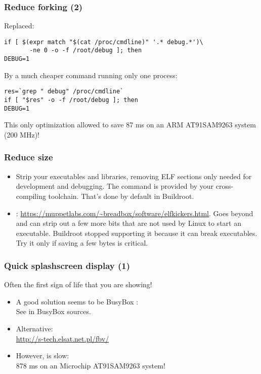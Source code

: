 \begin{frame}[fragile]
\frametitle{Reduce forking (2)}
Replaced:
\begin{block}{}
\begin{verbatim}
if [ $(expr match "$(cat /proc/cmdline)" '.* debug.*')\
       -ne 0 -o -f /root/debug ]; then
DEBUG=1
\end{verbatim}
\end{block}
By a much cheaper command running only one process:
\begin{block}{}
\begin{verbatim}
res=`grep " debug" /proc/cmdline`
if [ "$res" -o -f /root/debug ]; then
DEBUG=1
\end{verbatim}
\end{block}
This only optimization allowed to save 87 ms on an ARM AT91SAM9263
system (200 MHz)!
\end{frame}


\begin{frame}
\frametitle{Reduce size}
\begin{itemize}
	\item Strip your executables and libraries, removing ELF sections
		only needed for development and debugging. The 
		command is provided by your cross-compiling toolchain.
		That's done by default in Buildroot.
	\item {}:
		\url{https://muppetlabs.com/~breadbox/software/elfkickers.html}.
		Goes beyond  and can strip out a few more bits
		that are not used by Linux to start an executable.
		Buildroot stopped supporting it because it can break
	        executables. Try it only if saving a few bytes is
		critical.
\end{itemize}
\end{frame}

\begin{frame}
\frametitle{Quick splashscreen display (1)}
Often the first sign of life that you are showing!
\begin{itemize}
\item A good solution seems to be BusyBox :\\
      See  in BusyBox sources.
\item Alternative: \\
      \url{http://s-tech.elsat.net.pl/fbv/}
\item However, \code{fbv} is slow:\\
      878 ms on an Microchip AT91SAM9263 system!
\end{itemize}
\end{frame}

